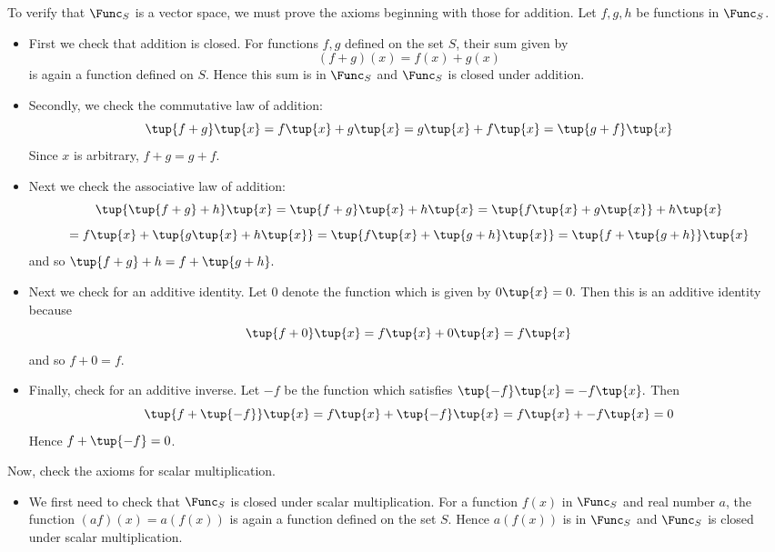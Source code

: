 \begin{solution}
To verify that $\Func_S$ is a vector space, we must prove the axioms beginning with those for addition. Let $f, g, h$ be functions in $\Func_S$. 

\begin{itemize}
\item
First we check that addition is closed.  For functions $f, g$ defined on the set $S$, their sum given by 
\[
(f+g)(x) = f(x)+g(x)
\]
is again a function defined on $S$. Hence this sum is in $\Func_S$ and $\Func_S$ is closed under addition. 

\item
Secondly, we check the commutative law of addition:
\begin{equation*}
\tup{f+g} \tup{x} =f\tup{x} +g\tup{x}
=g\tup{x} +f\tup{x} =\tup{g+f} \tup{x}
\end{equation*}
Since $x$ is arbitrary, $f+g=g+f$.

\item
Next we check the associative law of addition:
\begin{equation*}
\tup{\tup{f+g} +h} \tup{x} = \tup{f+g}
\tup{x} +h\tup{x} =\tup{f\tup{x} +g\tup{x}
} +h\tup{x}
\end{equation*}
\begin{equation*}
=f\tup{x} +\tup{g\tup{x} +h\tup{x} } =\tup{
f\tup{x} +\tup{g+h} \tup{x} } =\tup{f+\tup{
g+h} } \tup{x}
\end{equation*}
and so $\tup{f+g} +h=f+\tup{g+h} .$

\item
Next we check for an additive identity.  Let $0$ denote the
function which is given by $0\tup{x} =0.$ Then this is an additive
identity because 
\begin{equation*}
\tup{f+0} \tup{x} =f\tup{x} +0\tup{x}
=f\tup{x}
\end{equation*}
and so $f+0=f$. 

\item
Finally, check for an additive inverse. Let $-f$ be the function which satisfies $\tup{-f}
\tup{x} = -f\tup{x} .$ Then 
\begin{equation*}
\tup{f+\tup{-f} } \tup{x} = f\tup{x}
+\tup{-f} \tup{x} = f\tup{x} +-f\tup{x}
=0
\end{equation*}
Hence $f+\tup{-f} =0$. 
\end{itemize}

Now, check the axioms for scalar multiplication.
\begin{itemize}
\item
We first need to check that $\Func_S$ is closed under scalar multiplication. 
For a function $f(x)$ in $\Func_S$ and real number $a$, the function $(af)(x) = a(f(x))$ is again a function defined on the set $S$. Hence $a(f(x))$ is in $\Func_S$ and $\Func_S$ is closed under scalar multiplication. 


\end{itemize}
\end{solution}
